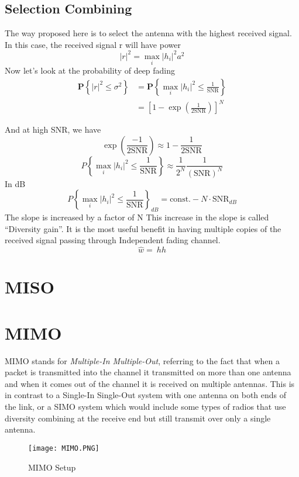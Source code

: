 \subsection{Selection Combining}
The way proposed here is to select the antenna with the highest received signal.
In this case, the received signal r will have power
\[|r|^2= \max_i{|h_i|^2 a^2}\]
Now let's look at the probability of deep fading
\begin{equation}
    \label{eq:p of deep fading in SIMO}
    \begin{aligned}
        \mathbf{P}\left\{|r|^2 \leq \sigma^2 \right\} &= \mathbf{P}\left\{\max_i{|h_i|^2 \leq \frac{1}{\text{SNR}}}\right\} \\
        & =\left[1- \exp \left( \frac{1}{2\text{SNR}} \right) \right]^N
    \end{aligned}
\end{equation}

And at high SNR, we have 
\[\exp \left( \frac{-1}{2\text{SNR}} \right) \approx 1-\frac{1}{2\text{SNR}}\]
\[P\left\{\max_i{\left|h_i\right|^2\le\frac{1}{\text{SNR}}}\right\}\approx\frac{1}{2^N}\frac{1}{\left(\text{SNR}\right)^N}\]
In dB 
\[P\left\{\max_i{\left|h_i\right|^2\le\frac{1}{\text{SNR}}}\right\}_{dB}= \text{const.} - N \cdot \text{SNR}_{dB}\]
The slope is increased by a factor of N 
This increase in the slope is called “Diversity gain”.
It is the most useful benefit in having multiple copies of the received signal passing through
Independent fading channel.
\[\hat{w}=\ hh\]

\section{MISO}

\section{MIMO}
MIMO stands for \emph{Multiple-In Multiple-Out}, referring to the fact that when a packet is transmitted into the channel it transmitted on more than one antenna and when it comes out of the channel it is received on multiple antennas. This is in contrast to a Single-In Single-Out system with one antenna on both ends of the link, or a SIMO system which would include some types of radios that use diversity combining at the receive end but still transmit over only a single antenna.
\begin{figure}[ht]
    \centering
    \texttt{[image: MIMO.PNG]}
    \caption{MIMO Setup}
    \label{fig:MIMO}
\end{figure}

